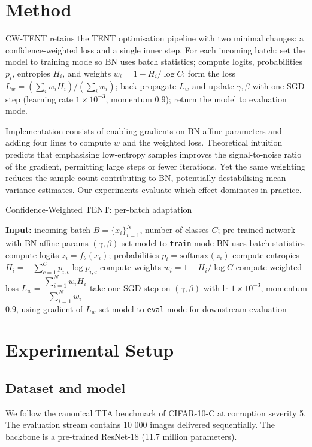 \documentclass{article} %
\begin{document}
\section{Method}
\label{sec:method}
CW-TENT retains the TENT optimisation pipeline with two minimal changes: a confidence-weighted loss and a single inner step. For each incoming batch: set the model to training mode so BN uses batch statistics; compute logits, probabilities \(p_{i}\), entropies \(H_{i}\), and weights \(w_{i} = 1 - H_{i}/\log C\); form the loss \(L_{w} = (\sum_{i} w_{i} H_{i})/(\sum_{i} w_{i})\); back-propagate \(L_{w}\) and update \(\gamma, \beta\) with one SGD step (learning rate \(1 \times 10^{-3}\), momentum 0.9); return the model to evaluation mode.

Implementation consists of enabling gradients on BN affine parameters and adding four lines to compute \(w\) and the weighted loss. Theoretical intuition predicts that emphasising low-entropy samples improves the signal-to-noise ratio of the gradient, permitting large steps or fewer iterations. Yet the same weighting reduces the sample count contributing to BN, potentially destabilising mean-variance estimates. Our experiments evaluate which effect dominates in practice.

\begin{algorithm}[H]
\caption{Confidence-Weighted TENT: per-batch adaptation}
\begin{algorithmic}
\State \textbf{Input:} incoming batch \(B=\{x_{i}\}_{i=1}^{N}\), number of classes \(C\); pre-trained network with BN affine params \((\gamma, \beta)\)
\State set model to \texttt{train} mode \Comment BN uses batch statistics
\State compute logits \(z_{i} = f_{\theta}(x_{i})\); probabilities \(p_{i} = \mathrm{softmax}(z_{i})\)
\State compute entropies \(H_{i} = -\sum_{c=1}^{C} p_{i,c} \log p_{i,c}\)
\State compute weights \(w_{i} = 1 - H_{i}/\log C\)
\State compute weighted loss \(L_{w} = \dfrac{\sum_{i=1}^{N} w_{i} H_{i}}{\sum_{i=1}^{N} w_{i}}\)
\State take one SGD step on \((\gamma, \beta)\) with lr \(1\times 10^{-3}\), momentum 0.9, using gradient of \(L_{w}\)
\State set model to \texttt{eval} mode \Comment for downstream evaluation
\end{algorithmic}
\end{algorithm}

\section{Experimental Setup}
\label{sec:experimental}
\subsection{Dataset and model}
We follow the canonical TTA benchmark of CIFAR-10-C at corruption severity 5. The evaluation stream contains 10 000 images delivered sequentially. The backbone is a pre-trained ResNet-18 (11.7 million parameters).
\end{document}
